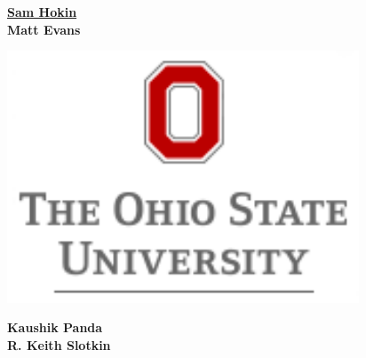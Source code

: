 \documentclass[a0,30pt]{sciposter}
\begin{document}
\begin{minipage}[m]{0.19\linewidth}
  \color{Black}
  \Large
  \textbf{\underline{Sam Hokin} \\ Matt Evans}
  \hfill
\end{minipage}
\begin{minipage}[m]{0.15\linewidth}
  \includegraphics[height=75mm]{ohio-state-vert.png}
\end{minipage}
\begin{minipage}[m]{0.15\linewidth}
  \color{Black}
  \Large
  \textbf{Kaushik Panda \\ R. Keith Slotkin}
  \hfill
\end{minipage}

\vspace{5mm} %

\color{CarnegiePriBlue}
\hrulefill

\color{Black}
\end{document}
